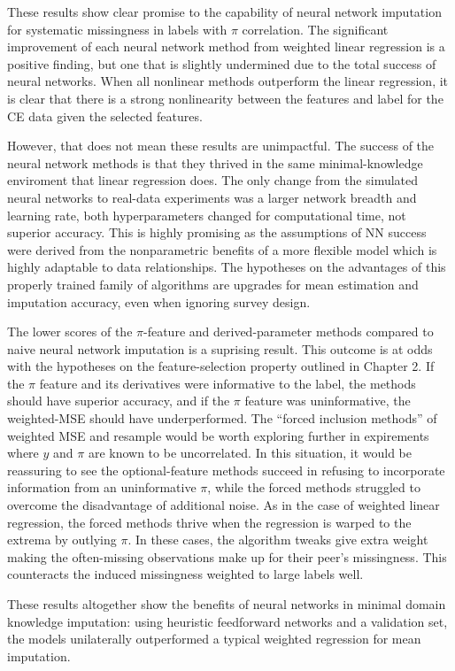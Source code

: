 \documentclass[12pt,twoside]{reedthesis}
\begin{document}
These results show clear promise to the capability of neural network
imputation for systematic missingness in labels with \(\pi\)
correlation. The significant improvement of each neural network method
from weighted linear regression is a positive finding, but one that is
slightly undermined due to the total success of neural networks. When
all nonlinear methods outperform the linear regression, it is clear that
there is a strong nonlinearity between the features and label for the CE
data given the selected features.

However, that does not mean these results are unimpactful. The success
of the neural network methods is that they thrived in the same
minimal-knowledge enviroment that linear regression does. The only
change from the simulated neural networks to real-data experiments was a
larger network breadth and learning rate, both hyperparameters changed
for computational time, not superior accuracy. This is highly promising
as the assumptions of NN success were derived from the nonparametric
benefits of a more flexible model which is highly adaptable to data
relationships. The hypotheses on the advantages of this properly trained
family of algorithms are upgrades for mean estimation and imputation
accuracy, even when ignoring survey design.

The lower scores of the \(\pi\)-feature and derived-parameter methods
compared to naive neural network imputation is a suprising result. This
outcome is at odds with the hypotheses on the feature-selection property
outlined in Chapter 2. If the \(\pi\) feature and its derivatives were
informative to the label, the methods should have superior accuracy, and
if the \(\pi\) feature was uninformative, the weighted-MSE should have
underperformed. The ``forced inclusion methods'' of weighted MSE and
resample would be worth exploring further in expirements where \(y\) and
\(\pi\) are known to be uncorrelated. In this situation, it would be
reassuring to see the optional-feature methods succeed in refusing to
incorporate information from an uninformative \(\pi\), while the forced
methods struggled to overcome the disadvantage of additional noise. As
in the case of weighted linear regression, the forced methods thrive
when the regression is warped to the extrema by outlying \(\pi\). In
these cases, the algorithm tweaks give extra weight making the
often-missing observations make up for their peer's missingness. This
counteracts the induced missingness weighted to large labels well.

These results altogether show the benefits of neural networks in minimal
domain knowledge imputation: using heuristic feedforward networks and a
validation set, the models unilaterally outperformed a typical weighted
regression for mean imputation.
\end{document}
